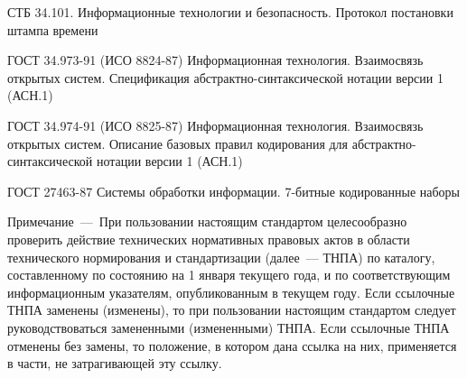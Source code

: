 СТБ 34.101. Информационные технологии и безопасность. 
Протокол постановки штампа времени

ГОСТ 34.973-91 (ИСО 8824-87) Информационная технология. Взаимосвязь 
открытых систем. Спецификация абстрактно-синтаксической нотации версии 1 
(АСН.1) 

ГОСТ 34.974-91 (ИСО 8825-87) Информационная технология. Взаимосвязь 
открытых систем. Описание базовых правил кодирования для 
абстрактно-синтаксической нотации версии 1 (АСН.1) 

ГОСТ 27463-87 Системы обработки информации. 7-битные кодированные наборы 

\begin{note}
Примечание~---~При пользовании настоящим стандартом
целесообразно проверить действие технических нормативных правовых
актов в области технического нормирования и стандартизации (далее~--- ТНПА) 
по каталогу, составленному по состоянию на 1 января текущего
года, и по соответствующим информационным указателям, опубликованным
в текущем году. Если ссылочные ТНПА заменены (изменены), то при
пользовании настоящим стандартом следует руководствоваться
замененными (измененными) ТНПА. Если ссылочные ТНПА отменены без
замены, то положение, в котором дана ссылка на них, применяется в
части, не затрагивающей эту ссылку.
\end{note}
